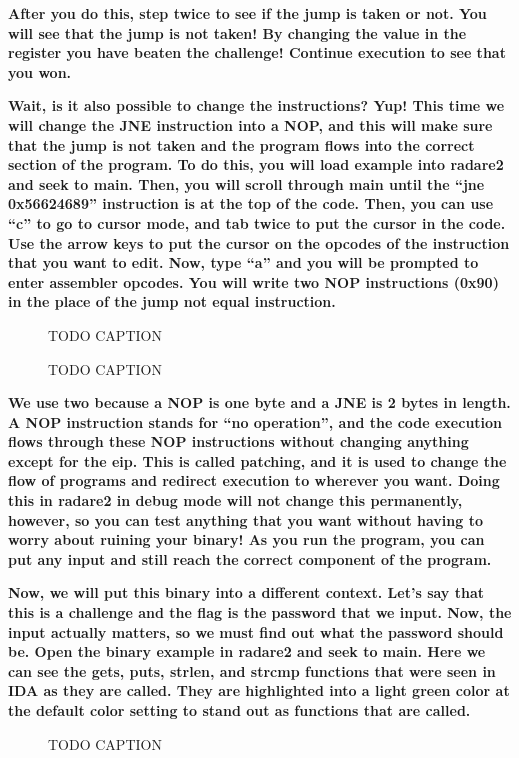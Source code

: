 \documentclass[letterpaper]{article}
\newcommand{\sitfig}[3]{
\begin{figure}[H]
\centering
\makebox[\textwidth][c]{
#2
}
\caption{#3}
\label{#1}
\end{figure}
}
\newcommand{\sitgfx}[4][scale=1.0]{
\sitfig{#3}{\texttt{[image: \#2]}}{#4}
}
\begin{document}
\textbf{After you do this, step twice to see if the jump is taken or not. You will see that the jump is not taken! By
changing the value in the register you have beaten the challenge! Continue execution to see that you won.}

\textbf{Wait, is it also possible to change the instructions? Yup! This time we will change the JNE instruction into a
NOP, and this will make sure that the jump is not taken and the program flows into the correct section of the program.
To do this, you will load example into radare2 and seek to main. Then, you will scroll through main until the ``jne
0x56624689'' instruction is at the top of the code. Then, you can use ``c'' to go to cursor mode, and tab twice to put
the cursor in the code. Use the arrow keys to put the cursor on the opcodes of the instruction that you want to edit.
Now, type ``a'' and you will be prompted to enter assembler opcodes.  You will write two NOP instructions (0x90) in the
place of the jump not equal instruction.}

  
\sitgfx[width=6.5in,height=4.0626in]{FINALWORKINGDOCFORMERLYPRECURSOR-img056.png}{fig:unk}{TODO CAPTION}
 

  
\sitgfx[width=6.5in,height=4.0626in]{FINALWORKINGDOCFORMERLYPRECURSOR-img057.png}{fig:unk}{TODO CAPTION}
 

\textbf{We use two because a NOP is one byte and a JNE is 2 bytes in length. A NOP instruction stands for ``no
operation'', and the code execution flows through these NOP instructions without changing anything except for the eip.
This is called patching, and it is used to change the flow of programs and redirect execution to wherever you want.
Doing this in radare2 in debug mode will not change this permanently, however, so you can test anything that you want
without having to worry about ruining your binary! As you run the program, you can put any input and still reach the
correct component of the program.}

\textbf{Now, we will put this binary into a different context. Let's say that this is a challenge and the flag is the
password that we input. Now, the input actually matters, so we must find out what the password should be. Open the
binary example in radare2 and seek to main. Here we can see the gets, puts, strlen, and strcmp functions that were seen
in IDA as they are called. They are highlighted into a light green color at the default color setting to stand out as
functions that are called.}

  
\sitgfx[width=6.5in,height=4.0626in]{FINALWORKINGDOCFORMERLYPRECURSOR-img053.png}{fig:unk}{TODO CAPTION}
 
\end{document}
